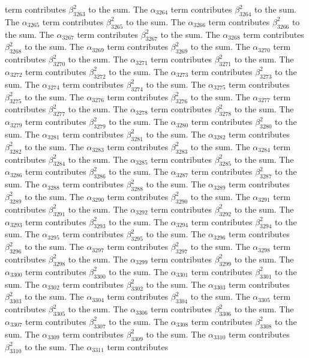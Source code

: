\begin{lemma}
term contributes $\beta_{3263}^{2}$ to the sum. The $\alpha_{3264}$ term contributes $\beta_{3264}^{2}$ to the sum. The $\alpha_{3265}$ term contributes $\beta_{3265}^{2}$ to the sum. The $\alpha_{3266}$ term contributes $\beta_{3266}^{2}$ to the sum. The $\alpha_{3267}$ term contributes $\beta_{3267}^{2}$ to the sum. The $\alpha_{3268}$ term contributes $\beta_{3268}^{2}$ to the sum. The $\alpha_{3269}$ term contributes $\beta_{3269}^{2}$ to the sum. The $\alpha_{3270}$ term contributes $\beta_{3270}^{2}$ to the sum. The $\alpha_{3271}$ term contributes $\beta_{3271}^{2}$ to the sum. The $\alpha_{3272}$ term contributes $\beta_{3272}^{2}$ to the sum. The $\alpha_{3273}$ term contributes $\beta_{3273}^{2}$ to the sum. The $\alpha_{3274}$ term contributes $\beta_{3274}^{2}$ to the sum. The $\alpha_{3275}$ term contributes $\beta_{3275}^{2}$ to the sum. The $\alpha_{3276}$ term contributes $\beta_{3276}^{2}$ to the sum. The $\alpha_{3277}$ term contributes $\beta_{3277}^{2}$ to the sum. The $\alpha_{3278}$ term contributes $\beta_{3278}^{2}$ to the sum. The $\alpha_{3279}$ term contributes $\beta_{3279}^{2}$ to the sum. The $\alpha_{3280}$ term contributes $\beta_{3280}^{2}$ to the sum. The $\alpha_{3281}$ term contributes $\beta_{3281}^{2}$ to the sum. The $\alpha_{3282}$ term contributes $\beta_{3282}^{2}$ to the sum. The $\alpha_{3283}$ term contributes $\beta_{3283}^{2}$ to the sum. The $\alpha_{3284}$ term contributes $\beta_{3284}^{2}$ to the sum. The $\alpha_{3285}$ term contributes $\beta_{3285}^{2}$ to the sum. The $\alpha_{3286}$ term contributes $\beta_{3286}^{2}$ to the sum. The $\alpha_{3287}$ term contributes $\beta_{3287}^{2}$ to the sum. The $\alpha_{3288}$ term contributes $\beta_{3288}^{2}$ to the sum. The $\alpha_{3289}$ term contributes $\beta_{3289}^{2}$ to the sum. The $\alpha_{3290}$ term contributes $\beta_{3290}^{2}$ to the sum. The $\alpha_{3291}$ term contributes $\beta_{3291}^{2}$ to the sum. The $\alpha_{3292}$ term contributes $\beta_{3292}^{2}$ to the sum. The $\alpha_{3293}$ term contributes $\beta_{3293}^{2}$ to the sum. The $\alpha_{3294}$ term contributes $\beta_{3294}^{2}$ to the sum. The $\alpha_{3295}$ term contributes $\beta_{3295}^{2}$ to the sum. The $\alpha_{3296}$ term contributes $\beta_{3296}^{2}$ to the sum. The $\alpha_{3297}$ term contributes $\beta_{3297}^{2}$ to the sum. The $\alpha_{3298}$ term contributes $\beta_{3298}^{2}$ to the sum. The $\alpha_{3299}$ term contributes $\beta_{3299}^{2}$ to the sum. The $\alpha_{3300}$ term contributes $\beta_{3300}^{2}$ to the sum. The $\alpha_{3301}$ term contributes $\beta_{3301}^{2}$ to the sum. The $\alpha_{3302}$ term contributes $\beta_{3302}^{2}$ to the sum. The $\alpha_{3303}$ term contributes $\beta_{3303}^{2}$ to the sum. The $\alpha_{3304}$ term contributes $\beta_{3304}^{2}$ to the sum. The $\alpha_{3305}$ term contributes $\beta_{3305}^{2}$ to the sum. The $\alpha_{3306}$ term contributes $\beta_{3306}^{2}$ to the sum. The $\alpha_{3307}$ term contributes $\beta_{3307}^{2}$ to the sum. The $\alpha_{3308}$ term contributes $\beta_{3308}^{2}$ to the sum. The $\alpha_{3309}$ term contributes $\beta_{3309}^{2}$ to the sum. The $\alpha_{3310}$ term contributes $\beta_{3310}^{2}$ to the sum. The $\alpha_{3311}$ term contributes 
\end{lemma}
